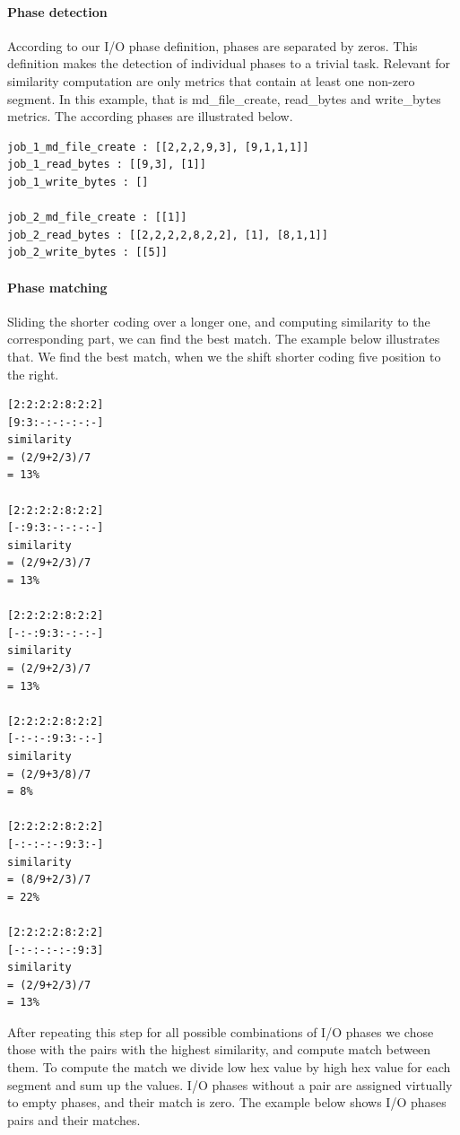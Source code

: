 \documentclass[]{llncs}
\begin{document}
\paragraph{Phase detection}
According to our I/O phase definition, phases are separated by zeros.
This definition makes the detection of individual phases to a trivial task.
Relevant for similarity computation are only metrics that contain at least one non-zero segment.
In this example, that is md\_file\_create, read\_bytes and write\_bytes metrics.
The according phases are illustrated below.

\begin{lstlisting}
job_1_md_file_create : [[2,2,2,9,3], [9,1,1,1]]
job_1_read_bytes : [[9,3], [1]]
job_1_write_bytes : []

job_2_md_file_create : [[1]]
job_2_read_bytes : [[2,2,2,2,8,2,2], [1], [8,1,1]]
job_2_write_bytes : [[5]]
\end{lstlisting}


\paragraph{Phase matching}
Sliding the shorter coding over a longer one, and computing similarity to the corresponding part, we can find the best match.
The example below illustrates that.
We find the best match, when we the shift shorter coding five position to the right.


\begin{lstlisting}
[2:2:2:2:8:2:2]
[9:3:-:-:-:-:-]
similarity 
= (2/9+2/3)/7 
= 13%

[2:2:2:2:8:2:2]
[-:9:3:-:-:-:-]
similarity 
= (2/9+2/3)/7 
= 13%

[2:2:2:2:8:2:2]
[-:-:9:3:-:-:-]
similarity 
= (2/9+2/3)/7 
= 13%

[2:2:2:2:8:2:2]
[-:-:-:9:3:-:-]
similarity 
= (2/9+3/8)/7
= 8%

[2:2:2:2:8:2:2]
[-:-:-:-:9:3:-]
similarity
= (8/9+2/3)/7
= 22%

[2:2:2:2:8:2:2]
[-:-:-:-:-:9:3]
similarity 
= (2/9+2/3)/7 
= 13%
\end{lstlisting}


After repeating this step for all possible combinations of I/O phases we chose those with the pairs with the highest similarity, and compute match between them.
To compute the match we divide low hex value by high hex value for each segment and sum up the values.
I/O phases without a pair are assigned virtually to empty phases, and their match is zero.
The example below shows I/O phases pairs and their matches.
\end{document}
